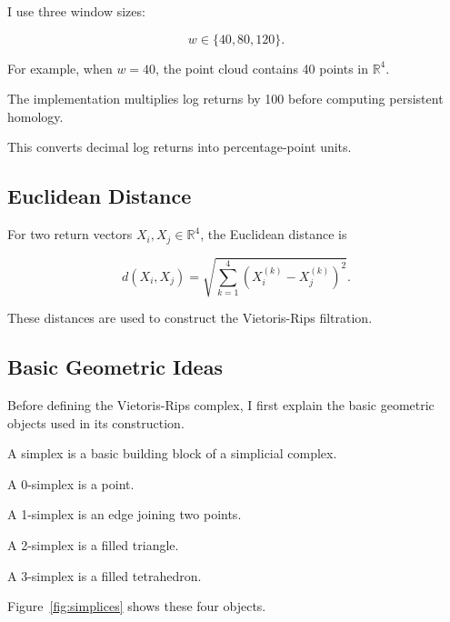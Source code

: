 \documentclass[oneside,english,11pt]{article}
\renewcommand{\boxed}[1]{#1}
\begin{document}
I use three window sizes:

\begin{equation}
w\in\{40,80,120\}.
\end{equation}

For example, when $w=40$, the point cloud contains
40 points in $\mathbb{R}^4$.

The implementation multiplies log returns by 100
before computing persistent homology.

This converts decimal log returns into
percentage-point units.

\subsection{Euclidean Distance}

For two return vectors $X_i,X_j\in\mathbb{R}^4$,
the Euclidean distance is

\begin{equation}
\boxed{
d(X_i,X_j)
=
\sqrt{
\sum_{k=1}^{4}
\left(
X_i^{(k)}-X_j^{(k)}
\right)^2
}.
}
\end{equation}

These distances are used to construct the
Vietoris-Rips filtration.

\subsection{Basic Geometric Ideas}

Before defining the Vietoris-Rips complex, I first
explain the basic geometric objects used in its
construction.

A simplex is a basic building block of a
simplicial complex.

A 0-simplex is a point.

A 1-simplex is an edge joining two points.

A 2-simplex is a filled triangle.

A 3-simplex is a filled tetrahedron.

Figure~\ref{fig:simplices} shows these four objects.
\end{document}

